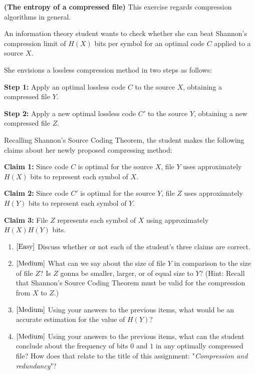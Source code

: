 \textbf{(The entropy of a compressed file)} This exercise regards compression algorithms in general.

An information theory student wants to check whether she can beat Shannon's compression limit of $H(X)$ bits per symbol for an optimal code $C$ applied to a source $X$.

She envisions a lossless compression method in two steps as follows:

\textbf{Step 1:} Apply an optimal lossless code $C$ to the source $X$, obtaining a compressed file $Y$.

\textbf{Step 2:} Apply a new optimal lossless code $C'$ to the source $Y$, obtaining a new compressed file $Z$.

Recalling Shannon's Source Coding Theorem, the student makes the following claims about her newly proposed compressing method:

\textbf{Claim 1:} Since code $C$ is optimal for the source $X$, file $Y$ uses approximately $H(X)$ bits to represent each symbol of $X$.

\textbf{Claim 2:} Since code $C'$ is optimal for the source $Y$, file $Z$ uses approximately $H(Y)$ bits to represent each symbol of $Y$.

\textbf{Claim 3:} File $Z$ represents each symbol of $X$ using approximately $H(X)H(Y)$ bits.

\begin{enumerate}
	\item
	${\rm{[Easy]}}$ Discuss whether or not each of the student's three claims are correct.

	\item
	${\rm{[Medium]}}$ What can we say about the size of file $Y$ in comparison to the size of file $Z$? Is $Z$ gonna be smaller, larger, or of equal size to $Y$? (Hint: Recall that Shannon's Source Coding Theorem must be valid for the compression from $X$ to $Z$.)

	\item
	${\rm{[Medium]}}$ Using your answers to the previous items, what would be an accurate estimation for the value of $H(Y)$?

	\item
	${\rm{[Medium]}}$ Using your answers to the previous items, what can the student conclude about the frequency of bits $0$ and $1$ in any optimally compressed file? How does that relate to the title of this assignment: "\textit{Compression and redundancy}"?
	
\end{enumerate}

